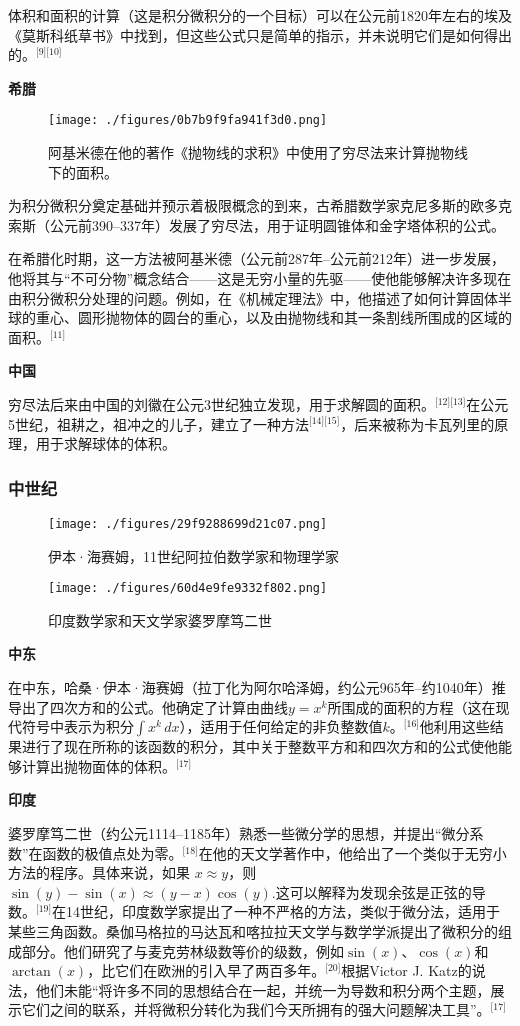 体积和面积的计算（这是积分微积分的一个目标）可以在公元前1820年左右的埃及《莫斯科纸草书》中找到，但这些公式只是简单的指示，并未说明它们是如何得出的。\(^\text{[9][10]}\)

\textbf{希腊}

\begin{figure}[ht]
\centering
\texttt{[image: ./figures/0b7b9f9fa941f3d0.png]}
\caption{阿基米德在他的著作《抛物线的求积》中使用了穷尽法来计算抛物线下的面积。} \label{fig_Calcul_1}
\end{figure}
为积分微积分奠定基础并预示着极限概念的到来，古希腊数学家克尼多斯的欧多克索斯（公元前390–337年）发展了穷尽法，用于证明圆锥体和金字塔体积的公式。

在希腊化时期，这一方法被阿基米德（公元前287年–公元前212年）进一步发展，他将其与“不可分物”概念结合——这是无穷小量的先驱——使他能够解决许多现在由积分微积分处理的问题。例如，在《机械定理法》中，他描述了如何计算固体半球的重心、圆形抛物体的圆台的重心，以及由抛物线和其一条割线所围成的区域的面积。\(^\text{[11]}\)

\textbf{中国} 

穷尽法后来由中国的刘徽在公元3世纪独立发现，用于求解圆的面积。\(^\text{[12][13]}\)在公元5世纪，祖耕之，祖冲之的儿子，建立了一种方法\(^\text{[14][15]}\)，后来被称为卡瓦列里的原理，用于求解球体的体积。
\subsubsection{中世纪}
\begin{figure}[ht]
\centering
\texttt{[image: ./figures/29f9288699d21c07.png]}
\caption{伊本·海赛姆，11世纪阿拉伯数学家和物理学家} \label{fig_Calcul_2}
\end{figure}
\begin{figure}[ht]
\centering
\texttt{[image: ./figures/60d4e9fe9332f802.png]}
\caption{印度数学家和天文学家婆罗摩笃二世} \label{fig_Calcul_3}
\end{figure}

\textbf{中东}  

在中东，哈桑·伊本·海赛姆（拉丁化为阿尔哈泽姆，约公元965年–约1040年）推导出了四次方和的公式。他确定了计算由曲线\(y = x^k\)所围成的面积的方程（这在现代符号中表示为积分\(\int x^k \, dx\)），适用于任何给定的非负整数值\(k\)。\(^\text{[16]}\)他利用这些结果进行了现在所称的该函数的积分，其中关于整数平方和和四次方和的公式使他能够计算出抛物面体的体积。\(^\text{[17]}\)

\textbf{印度}

婆罗摩笃二世（约公元1114–1185年）熟悉一些微分学的思想，并提出“微分系数”在函数的极值点处为零。\(^\text{[18]}\)在他的天文学著作中，他给出了一个类似于无穷小方法的程序。具体来说，如果 \(x \approx y\)，则\(\sin(y) - \sin(x) \approx (y - x) \cos(y)\).这可以解释为发现余弦是正弦的导数。\(^\text{[19]}\)在14世纪，印度数学家提出了一种不严格的方法，类似于微分法，适用于某些三角函数。桑伽马格拉的马达瓦和喀拉拉天文学与数学学派提出了微积分的组成部分。他们研究了与麦克劳林级数等价的级数，例如\(\sin(x)\)、\(\cos(x)\)和\(\arctan(x)\)，比它们在欧洲的引入早了两百多年。\(^\text{[20]}\)根据Victor J. Katz的说法，他们未能“将许多不同的思想结合在一起，并统一为导数和积分两个主题，展示它们之间的联系，并将微积分转化为我们今天所拥有的强大问题解决工具”。\(^\text{[17]}\)
